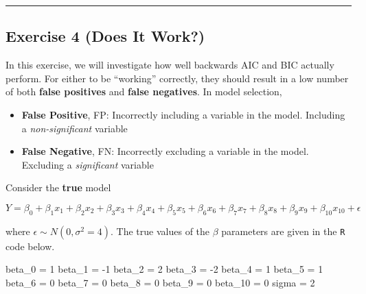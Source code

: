 \documentclass[
]{article}
\newenvironment{Shaded}{\begin{snugshade}}{\end{snugshade}}
\newcommand{\DecValTok}[1]{\textcolor[rgb]{0.00,0.00,0.81}{#1}}
\newcommand{\NormalTok}[1]{#1}
\newcommand{\OtherTok}[1]{\textcolor[rgb]{0.56,0.35,0.01}{#1}}
\newcommand{\SpecialCharTok}[1]{\textcolor[rgb]{0.00,0.00,0.00}{#1}}
\providecommand{\tightlist}{%
  \setlength{\itemsep}{0pt}\setlength{\parskip}{0pt}}
\begin{document}
\begin{center}\rule{0.5\linewidth}{0.5pt}\end{center}

\hypertarget{exercise-4-does-it-work}{%
\subsection{Exercise 4 (Does It Work?)}\label{exercise-4-does-it-work}}

In this exercise, we will investigate how well backwards AIC and BIC
actually perform. For either to be ``working'' correctly, they should
result in a low number of both \textbf{false positives} and
\textbf{false negatives}. In model selection,

\begin{itemize}
\tightlist
\item
  \textbf{False Positive}, FP: Incorrectly including a variable in the
  model. Including a \emph{non-significant} variable
\item
  \textbf{False Negative}, FN: Incorrectly excluding a variable in the
  model. Excluding a \emph{significant} variable
\end{itemize}

Consider the \textbf{true} model

\[
Y = \beta_0 + \beta_1 x_1 + \beta_2 x_2 + \beta_3 x_3 + \beta_4 x_4 + \beta_5 x_5 + \beta_6 x_6 + \beta_7 x_7 + \beta_8 x_8 + \beta_9 x_9 + \beta_{10} x_{10} + \epsilon
\]

where \(\epsilon \sim N(0, \sigma^2 = 4)\). The true values of the
\(\beta\) parameters are given in the \texttt{R} code below.

\begin{Shaded}
\begin{Highlighting}[]
\NormalTok{beta\_0  }\OtherTok{=} \DecValTok{1}
\NormalTok{beta\_1  }\OtherTok{=} \SpecialCharTok{{-}}\DecValTok{1}
\NormalTok{beta\_2  }\OtherTok{=} \DecValTok{2}
\NormalTok{beta\_3  }\OtherTok{=} \SpecialCharTok{{-}}\DecValTok{2}
\NormalTok{beta\_4  }\OtherTok{=} \DecValTok{1}
\NormalTok{beta\_5  }\OtherTok{=} \DecValTok{1}
\NormalTok{beta\_6  }\OtherTok{=} \DecValTok{0}
\NormalTok{beta\_7  }\OtherTok{=} \DecValTok{0}
\NormalTok{beta\_8  }\OtherTok{=} \DecValTok{0}
\NormalTok{beta\_9  }\OtherTok{=} \DecValTok{0}
\NormalTok{beta\_10 }\OtherTok{=} \DecValTok{0}
\NormalTok{sigma }\OtherTok{=} \DecValTok{2}
\end{Highlighting}
\end{Shaded}
\end{document}
